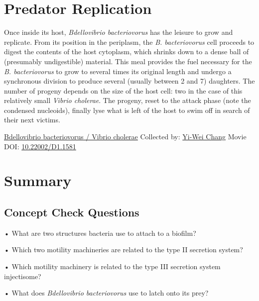\documentclass[]{tufte-book}
\begin{document}
\hypertarget{predator-replication}{%
\section{Predator Replication}\label{predator-replication}}

Once inside its host, \emph{Bdellovibrio bacteriovorus} has the leisure to grow and replicate. From its position in the periplasm, the \emph{B. bacteriovorus} cell proceeds to digest the contents of the host cytoplasm, which shrinks down to a dense ball of (presumably undigestible) material. This meal provides the fuel necessary for the \emph{B. bacteriovorus} to grow to several times its original length and undergo a synchronous division to produce several (usually between 2 and 7) daughters. The number of progeny depends on the size of the host cell: two in the case of this relatively small \emph{Vibrio cholerae}. The progeny, reset to the attack phase (note the condensed nucleoids), finally lyse what is left of the host to swim off in search of their next victims.



\hypertarget{htmlwidget-88be195c34b4b5fa57bc}{}

\label{fig:9-11}\protect\hyperlink{tree}{Bdellovibrio bacteriovorus / Vibrio cholerae} Collected by: \protect\hyperlink{yi-wei_chang}{Yi-Wei Chang} Movie DOI: \href{https://doi.org/10.22002/D1.1581}{10.22002/D1.1581}

\hypertarget{summary-8}{%
\section{Summary}\label{summary-8}}

\hypertarget{concept-check-questions-8}{%
\subsection*{Concept Check Questions}\label{concept-check-questions-8}}

• What are two structures bacteria use to attach to a biofilm?

• Which two motility machineries are related to the type II secretion system?

• Which motility machinery is related to the type III secretion system injectisome?

• What does \emph{Bdellovibrio bacteriovorus} use to latch onto its prey?
\end{document}
